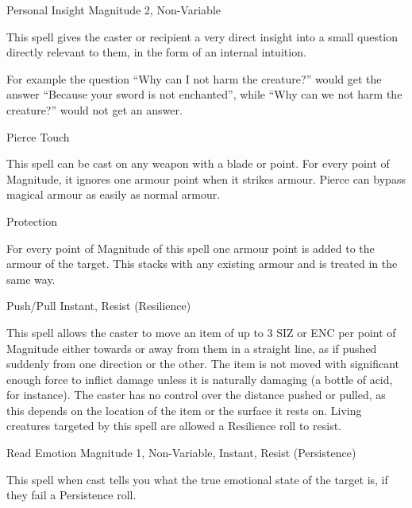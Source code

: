 \begin{rpg-spell}
{Personal Insight}
{Magnitude 2, Non-Variable}

This spell gives the caster or recipient a very direct insight into a small question directly relevant to them, in the form of an internal intuition.

For example the question “Why can I not harm the creature?” would get the answer “Because your sword is not enchanted”, while “Why can we not harm the creature?” would not get an answer.
\end{rpg-spell}


\begin{rpg-spell}
{Pierce}
{Touch}

This spell can be cast on any weapon with a blade or point. For every point of Magnitude, it ignores one armour point when it strikes armour. Pierce can bypass magical armour as easily as normal armour. 
\end{rpg-spell}


\begin{rpg-spell}
{Protection}
{}

For every point of Magnitude of this spell one armour point is added to the armour of the target. This stacks with any existing armour and is treated in the same way. 
\end{rpg-spell}


\begin{rpg-spell}
{Push/Pull}
{Instant, Resist (Resilience)}

This spell allows the caster to move an item of up to 3 SIZ or ENC per point of Magnitude either towards or away from them in a straight line, as if pushed suddenly from one direction or the other. The item is not moved with significant enough force to inflict damage unless it is naturally damaging (a bottle of acid, for instance). The caster has no control over the distance pushed or pulled, as this depends on the location of the item or the surface it rests on. Living creatures targeted by this spell are allowed a Resilience roll to resist.
\end{rpg-spell}


\begin{rpg-spell}
{Read Emotion}
{Magnitude 1, Non-Variable, Instant, Resist (Persistence)}

This spell when cast tells you what the true emotional state of the target is, if they fail a Persistence roll.
\end{rpg-spell}


